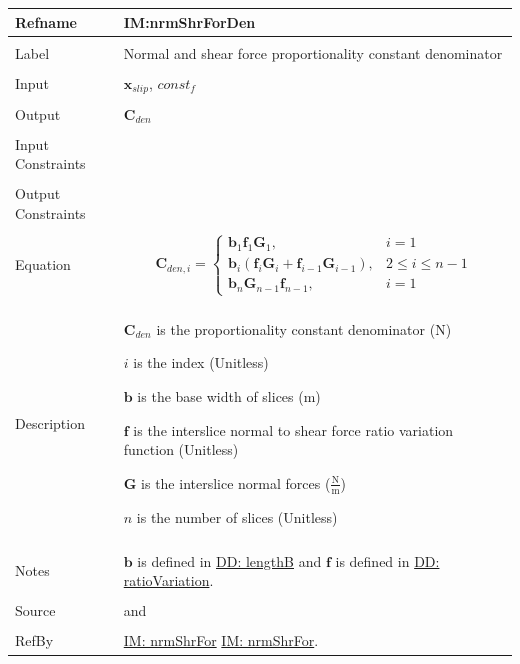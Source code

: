 \documentclass[12pt]{article}
\begin{document}
\noindent \begin{minipage}{\textwidth}
\begin{tabular}{p{} p{}}
\toprule \textbf{Refname} & \textbf{IM:nrmShrForDen}
\label{IM:nrmShrForDen}
\\ \midrule \\
Label & Normal and shear force proportionality constant denominator
\\ \midrule \\
Input & ${\mathbf{x}_{slip}}$, $const_f$
\\ \midrule \\
Output & ${\mathbf{C}_{den}}$
\\ \midrule \\
Input Constraints & 
\\ \midrule \\
Output Constraints & 
\\ \midrule \\
Equation & \begin{displaymath}
           {\mathbf{C}_{den,i}}=\begin{cases}
{\mathbf{b}}_{1} {\mathbf{f}}_{1} {\mathbf{G}}_{1}, & i=1\\
{\mathbf{b}}_{i} \left({\mathbf{f}}_{i} {\mathbf{G}}_{i}+{\mathbf{f}}_{i-1} {\mathbf{G}}_{i-1}\right), & 2\leq{}i\leq{}n-1\\
{\mathbf{b}}_{n} {\mathbf{G}}_{n-1} {\mathbf{f}}_{n-1}, & i=1
\end{cases}
           \end{displaymath}
\\ \midrule \\
Description & \begin{symbDescription}
              \item{${\mathbf{C}_{den}}$ is the proportionality constant denominator (N)}
              \item{$i$ is the index (Unitless)}
              \item{$\mathbf{b}$ is the base width of slices (m)}
              \item{$\mathbf{f}$ is the interslice normal to shear force ratio variation function (Unitless)}
              \item{$\mathbf{G}$ is the interslice normal forces ($\frac{\text{N}}{\text{m}}$)}
              \item{$n$ is the number of slices (Unitless)}
              \end{symbDescription}
\\ \midrule \\
Notes & $\mathbf{b}$ is defined in \hyperref[DD:lengthB]{DD: lengthB} and $\mathbf{f}$ is defined in \hyperref[DD:ratioVariation]{DD: ratioVariation}.
\\ \midrule \\
Source & \cite{chen2005} and \cite{karchewski2012}
\\ \midrule \\
RefBy & \hyperref[IM:nrmShrFor]{IM: nrmShrFor} \hyperref[IM:nrmShrFor]{IM: nrmShrFor}.
\\ \bottomrule \end{tabular}
\end{minipage}
\end{document}
